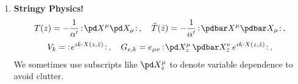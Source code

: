 \documentclass[a4paper,10pt]{article}
\begin{document}
\maketitle
\pagestyle{headings}
\thispagestyle{empty}


	\begin{enumerate}
	\item \textbf{Stringy Physics!}
	\begin{gather}
		T(z)
		= - \frac{1}{\alpha'}\,
			\normorder{\pd X^\mu \pd X_\mu}\,,\quad
		\tilde{T}(\bar{z})
		= - \frac{1}{\alpha'}\,
			\normorder{\pdbar X^\mu \pdbar X_\mu}\,,
	\\[.5ex]
		V_k = \normorder{
				e^{ik\cdot X(z,\bar{z})}
			}\,,\quad
		G_{e,k} = e_{\mu\nu}\,\normorder{
				\pd X^\mu_z\,
				\pdbar X^\nu_{\bar{z}}\,
				e^{ik\cdot X(z,\bar{z})}
			}\,,
	\end{gather}
	We sometimes use subscripts like $
		\pd X^\mu_z
	$ to denote variable dependence to avoid clutter. 
	

\end{enumerate}
\end{document}

